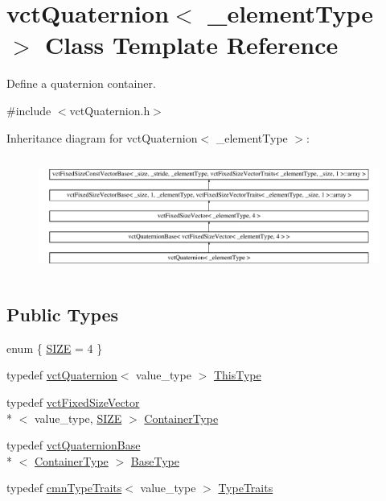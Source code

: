 \hypertarget{classvct_quaternion}{\section{vct\-Quaternion$<$ \-\_\-element\-Type $>$ Class Template Reference}
\label{classvct_quaternion}
}


Define a quaternion container.  




{\ttfamily \#include $<$vct\-Quaternion.\-h$>$}

Inheritance diagram for vct\-Quaternion$<$ \-\_\-element\-Type $>$\-:\begin{figure}[H]
\begin{center}
\leavevmode
\includegraphics[height=3.888889cm]{d7/de5/classvct_quaternion}
\end{center}
\end{figure}
\subsection*{Public Types}
\begin{DoxyCompactItemize}
\item 
enum \{ \hyperlink{classvct_quaternion_afa19be877555ceeedba0f4e910b22e51a12aabd231905465cec7ef73c8b4c043f}{S\-I\-Z\-E} = 4
 \}
\item 
typedef \hyperlink{classvct_quaternion}{vct\-Quaternion}$<$ value\-\_\-type $>$ \hyperlink{classvct_quaternion_a07e736b9769c53c9261fd2f4c79bf4c1}{This\-Type}
\item 
typedef \hyperlink{classvct_fixed_size_vector}{vct\-Fixed\-Size\-Vector}\\*
$<$ value\-\_\-type, \hyperlink{classvct_quaternion_afa19be877555ceeedba0f4e910b22e51a12aabd231905465cec7ef73c8b4c043f}{S\-I\-Z\-E} $>$ \hyperlink{classvct_quaternion_ac536cb4b97d3759e26fd33094a3630fa}{Container\-Type}
\item 
typedef \hyperlink{classvct_quaternion_base}{vct\-Quaternion\-Base}\\*
$<$ \hyperlink{classvct_quaternion_ac536cb4b97d3759e26fd33094a3630fa}{Container\-Type} $>$ \hyperlink{classvct_quaternion_a6904ddafc9719f3ba49ffd08dc0b0702}{Base\-Type}
\item 
typedef \hyperlink{classcmn_type_traits}{cmn\-Type\-Traits}$<$ value\-\_\-type $>$ \hyperlink{classvct_quaternion_a7a67c4eef1358c2853db271c468a1c03}{Type\-Traits}
\end{DoxyCompactItemize}
